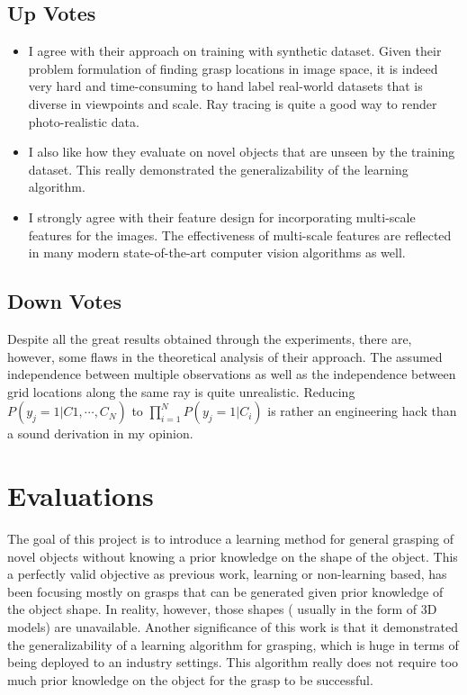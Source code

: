 \documentclass[10pt, twocolumn]{article}
\begin{document}
\subsection{Up Votes}
\begin{itemize}
  \item I agree with their approach on training with synthetic dataset. Given
    their problem formulation of finding grasp locations in image space, it
    is indeed very hard and time-consuming to hand label real-world datasets
    that is diverse in viewpoints and scale. Ray tracing is quite a good way
    to render photo-realistic data.
  \item I also like how they evaluate on novel objects that are unseen by
    the training dataset. This really demonstrated the generalizability of
    the learning algorithm.
  \item I strongly agree with their feature design for incorporating multi-scale
    features for the images. The effectiveness of multi-scale features are
    reflected in many modern state-of-the-art computer vision algorithms as well.
\end{itemize}


\subsection{Down Votes}
Despite all the great results obtained through the experiments, there are, however,
some flaws in the theoretical analysis of their approach. The assumed independence
between multiple observations as well as the independence between grid locations
along the same ray is quite unrealistic. Reducing $P(y_j = 1 | C1, \cdots, C_N)$
to $\prod_{i=1}^N P(y_j = 1 | C_i)$ is rather an engineering hack than a sound
derivation in my opinion.

\section{Evaluations}
The goal of this project is to introduce a learning method for general
grasping of novel objects without knowing a prior knowledge on the shape
of the object. This a perfectly valid objective as previous work, learning
or non-learning based, has been focusing mostly on grasps that can be generated
given prior knowledge of the object shape. In reality, however, those shapes (
usually in the form of 3D models) are unavailable. Another significance of this
work is that it demonstrated the generalizability of a learning algorithm for
grasping, which is huge in terms of being deployed to an industry settings.
This algorithm really does not require too much prior knowledge on the object
for the grasp to be successful.
\end{document}
